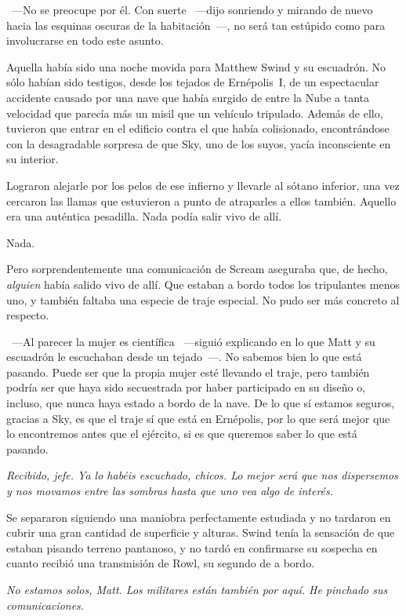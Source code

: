~---No se preocupe por él. Con suerte ~---dijo sonriendo y mirando de nuevo hacia las esquinas oscuras de la habitación~---, no será tan estúpido como para involucrarse en todo este asunto.

\bigskip\noindent
Aquella había sido una noche movida para Matthew Swind y su escuadrón. No sólo habían sido testigos, desde los tejados de Ernépolis~I, de un espectacular accidente causado por una nave que había surgido de entre la Nube a tanta velocidad que parecía más un misil que un vehículo tripulado. Además de ello, tuvieron que entrar en el edificio contra el que había colisionado, encontrándose con la desagradable sorpresa de que Sky, uno de los suyos, yacía inconsciente en su interior.

Lograron alejarle por los pelos de ese infierno y llevarle al sótano inferior, una vez cercaron las llamas que estuvieron a punto de atraparles a ellos también. Aquello era una auténtica pesadilla. Nada podía salir vivo de allí.

Nada.

Pero sorprendentemente una comunicación de Scream aseguraba que, de hecho, \emph{alguien} había salido vivo de allí. Que estaban a bordo todos los tripulantes menos uno, y también faltaba una especie de traje especial. No pudo ser más concreto al respecto.

~---Al parecer la mujer es científica ~---siguió explicando en lo que Matt y su escuadrón le escuchaban desde un tejado~---. No sabemos bien lo que está pasando. Puede ser que la propia mujer esté llevando el traje, pero también podría ser que haya sido secuestrada por haber participado en su diseño o, incluso, que nunca haya estado a bordo de la nave. De lo que sí estamos seguros, gracias a Sky, es que el traje sí que está en Ernépolis, por lo que será mejor que lo encontremos antes que el ejército, si es que queremos saber lo que está pasando.

\emph{Recibido, jefe. Ya lo habéis escuchado, chicos. Lo mejor será que nos dispersemos y nos movamos entre las sombras hasta que uno vea algo de interés.}

Se separaron siguiendo una maniobra perfectamente estudiada y no tardaron en cubrir una gran cantidad de superficie y alturas. Swind tenía la sensación de que estaban pisando terreno pantanoso, y no tardó en confirmarse su sospecha en cuanto recibió una transmisión de Rowl, su segundo de a bordo.

\emph{No estamos solos, Matt. Los militares están también por aquí. He pinchado sus comunicaciones.}

